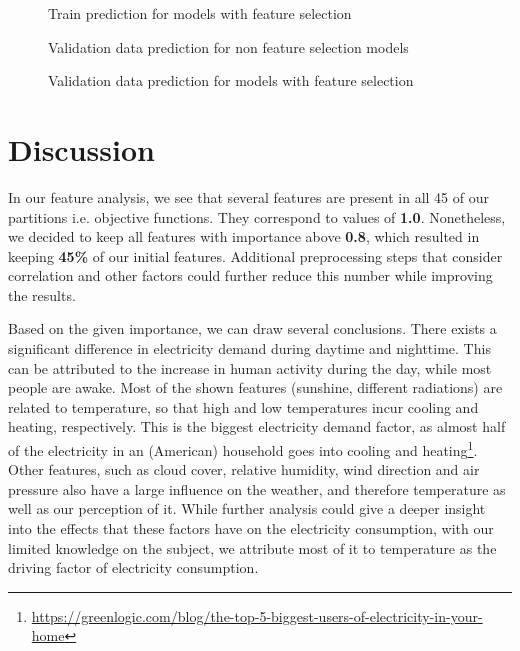 \documentclass[12pt]{article}
\begin{document}
\begin{figure}[H]
\centering
{}%
\hfill %
%
\caption{Train prediction for models with feature selection}
\end{figure}

\begin{figure}[H]
\centering
{}%
\hfill %
%
\hfill %
%
\caption{Validation data prediction for non feature selection models}
\end{figure}

\begin{figure}[H]
\centering
{}%
\hfill %
%
\caption{Validation data prediction for models with feature selection}
\end{figure}

\section{Discussion}

In our feature analysis, we see that several features are present in all 45 of our partitions i.e. objective functions. They correspond to values of \textbf{1.0}. Nonetheless, we decided to keep all features with importance above \textbf{0.8}, which resulted in keeping \textbf{45\%} of our initial features. Additional preprocessing steps that consider correlation and other factors could further reduce this number while improving the results.

Based on the given importance, we can draw several conclusions. There exists a significant difference in electricity demand during daytime and nighttime. This can be attributed to the increase in human activity during the day, while most people are awake. Most of the shown features (sunshine, different radiations) are related to temperature, so that high and low temperatures incur cooling and heating, respectively. This is the biggest electricity demand factor, as almost half of the electricity in an (American) household goes into cooling and heating\footnote{\url{https://greenlogic.com/blog/the-top-5-biggest-users-of-electricity-in-your-home}}. Other features, such as cloud cover, relative humidity, wind direction and air pressure also have a large influence on the weather, and therefore temperature as well as our perception of it. While further analysis could give a deeper insight into the effects that these factors have on the electricity consumption, with our limited knowledge on the subject, we attribute most of it to temperature as the driving factor of electricity consumption.
\end{document}
